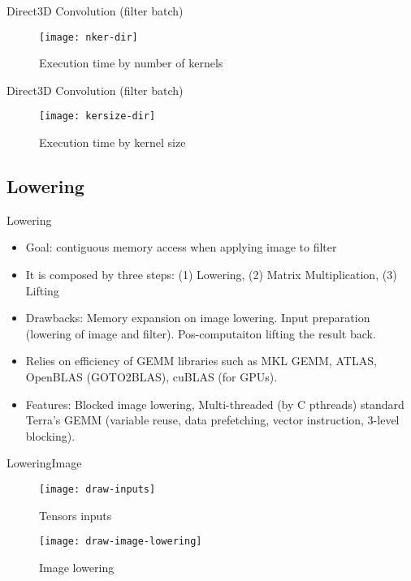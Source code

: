 \documentclass{beamer}
\begin{document}
\begin{frame}{Direct}{3D Convolution (filter batch)}
\begin{figure}[ht] \label{ fig7} 
      \texttt{[image: nker-dir]}
    \caption{Execution time by number of kernels} 
\end{figure}
\end{frame}

\begin{frame}{Direct}{3D Convolution (filter batch)}
\begin{figure}[ht] \label{ fig7} 
     \texttt{[image: kersize-dir]}
    \caption{Execution time by kernel size} 
\end{figure}
\end{frame}


\subsection{Lowering}

\begin{frame}{Lowering}
  \begin{itemize}
  \item {
    Goal: contiguous memory access when applying image to filter
  }
  \item {
   It is composed by three steps: (1) Lowering, (2) Matrix Multiplication, (3) Lifting
  }
  \item {
   Drawbacks: Memory expansion on image lowering. Input preparation (lowering of image and filter). Pos-computaiton lifting the result back. 
  }
  \item {
   Relies on efficiency of GEMM libraries such as MKL  GEMM, ATLAS, OpenBLAS (GOTO2BLAS), cuBLAS (for GPUs). 
  }
  \item {   
    Features: Blocked image lowering, Multi-threaded (by C pthreads) standard Terra's GEMM (variable reuse, data prefetching, vector instruction, 3-level blocking).
  }
  \end{itemize}
\end{frame}

\begin{frame}{Lowering}{Image}
\begin{figure}[ht] \label{ fig7} 
  \begin{minipage}[b]{0.5\linewidth}
      \texttt{[image: draw-inputs]}
    \caption{Tensors inputs} 
  \end{minipage} 

  \begin{minipage}[b]{0.5\linewidth}
     \texttt{[image: draw-image-lowering]}
    \caption{Image lowering} 
  \end{minipage}
  \hfill
\end{figure}
\end{frame}
\end{document}
